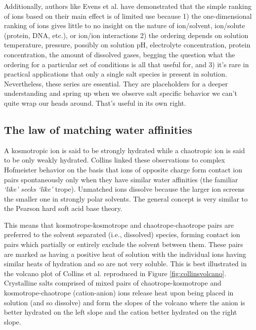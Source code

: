 \begin{intro}
    Additionally, authors like Evens et al.\cite{evens2008hofmeister} have demonstrated that the simple ranking of ions based on their main effect is of limited use because
    1) the one-dimensional ranking of ions gives little to no insight on the nature of ion/solvent, ion/solute (protein, DNA, etc.), or ion/ion interactions 2) the ordering
    depends on solution temperature, pressure, possibly on solution pH, electrolyte concentration, protein concentration, the amount of dissolved gases, begging the question
    what the ordering for a particular set of conditions is all that useful for, and 3) it's rare in practical applications that only a single salt species is present in
    solution. Nevertheless, these series are essential. They are placeholders for a deeper understanding and spring up when we observe salt specific behavior we can't quite 
    wrap our heads around. That's useful in its own right.
    
   \subsection{\label{ch1:sec1:level4}The law of matching water affinities}
    A kosmotropic ion is said to be strongly hydrated while a chaotropic ion is said to be only weakly hydrated. Collins linked these observations to complex Hofmeister behavior 
    on the basis that ions of opposite charge form contact ion pairs spontaneously only when they have similar water affinities (the familiar \emph{`like' seeks `like'} 
    trope)\cite{collins2004ions,collins2007review}. Unmatched ions dissolve because the larger ion screens the smaller one in strongly polar solvents\cite{lund2009dielectric}.
    The general concept is very similar to the Pearson hard soft acid base theory\cite{pearsonhsab0,pearsonhsab1,pearsonhsab2}.
    
    This means that kosmotrope-kosmotrope and chaotrope-chaotrope pairs are preferred to the solvent separated (i.e., dissolved) species, forming contact ion pairs which partially
    or entirely exclude the solvent between them. These pairs are marked as having a positive heat of solution with the individual ions having similar heats of hydration and so 
    are not very soluble. This is best illustrated in the volcano plot of Collins et al. reproduced in Figure \ref{fig:collinsvolcano}\cite{collins2007review}. Crystalline salts 
    comprised of mixed pairs of chaotrope-kosmotrope and kosmotrope-chaotrope (cation-anion) ions release heat upon being placed in solution (and so dissolve) and form the slopes
    of the volcano where the anion is better hydrated on the left slope and the cation better hydrated on the right slope.
    

\end{intro}
